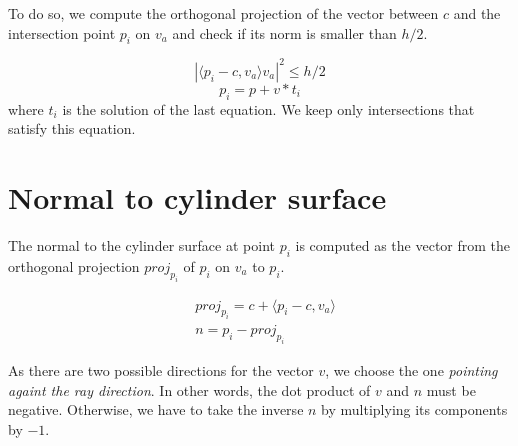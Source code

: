 \documentclass{article}
\begin{document}
To do so, we compute the orthogonal projection of the vector between $c$ and the intersection point $p_i$ on $v_a$ and check if its norm is smaller than $h/2$.

$$|\langle p_i-c, v_a\rangle v_a|^2 \leq h/2$$
$$p_i = p+v*t_i$$
where $t_i$ is the solution of the last equation. We keep only intersections that satisfy this equation.

\section{Normal to cylinder surface}
The normal to the cylinder surface at point $p_i$ is computed as the vector from the orthogonal projection $proj_{p_i}$ of $p_i$ on $v_a$ to $p_i$.

\begin{align*}
    &proj_{p_i} = c + \langle p_i-c, v_a \rangle \\
    &n = p_i - proj_{p_i}
\end{align*}

As there are two possible directions for the vector $v$, we choose the one \textit{pointing againt the ray direction}. In other words, the dot product of $v$ and $n$ must be negative. Otherwise, we have to take the inverse $n$ by multiplying its components by $-1$.
\end{document}
